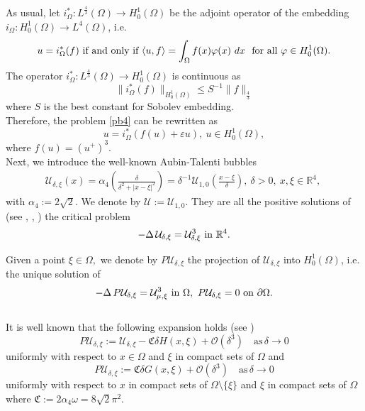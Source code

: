 \documentclass[11pt,a4paper]{amsart}
\renewcommand{\d }{\delta }
\newcommand{\Ua}{{\mathcal{U}}}
\newcommand{\U}{{\mathcal{U}_{\delta, \xi}}}
\theoremstyle{definition}
\renewcommand{\(}{\left(}
\renewcommand{\)}{\right)}
\begin{document}
As usual, let $i^{*}_\Omega: L^{\frac{4}{3}}(\Omega) \to H^{1}_{0}(\Omega)$ be the adjoint operator of the embedding $i_\Omega : H^{1}_{0}(\Omega) \to L^{4}(\Omega)$, i.e. 
$$u=i^{*}_\Omega(f)\ \hbox{if and only if}\ 
\langle u, f \rangle = \int_{\Omega} f(x) \varphi(x) \ dx
\ \hbox{
for all}\ \varphi \in H^{1}_{0}(\Omega).
$$
The operator $i^{*}_\Omega : L^{\frac{4}{3}}(\Omega) \to H^{1}_{0}(\Omega)$ is continuous as 
\begin{equation*}
\| i^{*}_\Omega(f) \|_{H^{1}_{0}(\Omega)} \leq S^{-1} \| f \|_{\frac{4}{3}}
\end{equation*}
where $S$ is the best constant for Sobolev embedding.\\
Therefore, the  problem \eqref{pb4} can be rewritten as 
\begin{equation}\label{213}
u=i^{*}_\Omega(f(u)+ \varepsilon u),\ u \in H^{1}_{0}(\Omega),
\end{equation}
where $f(u)=(u^+)^3.$ \\
Next, we introduce the well-known Aubin-Talenti bubbles  
\begin{eqnarray*}
\mathcal{U}_{\delta,\xi}(x)=\alpha_4\left(\frac{\delta}{\delta^{2}+|x-\xi|^2}\right)=\delta^{-1}\mathcal{U}_{1,0}\left(\frac{x-\xi}{\delta}\right),\ \delta>0,\ x,\xi\in\mathbb R^4,\  
\end{eqnarray*}
with $\alpha_4:=2\sqrt 2$. We denote by $\Ua:=\mathcal{U}_{1,0}$.
They are all the positive solutions of (see \cite{A}, \cite{CGS}, \cite{T}) the critical problem
\begin{equation}\label{pblim}
 -\Delta\, \mathcal{U}_{\delta,\xi}=\mathcal{U}_{\delta,\xi}^{3}\ \hbox{in}\ \mathbb R^4.\end{equation}

Given a point $\xi\in\Omega,$ we denote by $P\mathcal{U}_{\delta,\xi}$ the projection of $\mathcal{U}_{\delta,\xi}$ into $H^1_0(\Omega)$, i.e. the unique solution  of 
\begin{eqnarray}\label{Pre0001}
 -\Delta\, P\mathcal{U}_{\delta,\xi}=\mathcal{U}_{\mu,\xi}^{3}\ \hbox{in}\ \Omega,\ 
 P\mathcal{U}_{\delta,\xi}=0\ \hbox{on}\ \partial\Omega.
\end{eqnarray}
\\  It is well known that the following expansion holds (see \cite{R})
\begin{equation}\label{exp}
P\U:=\U-\mathfrak C\d H(x, \xi)+\mathcal O\left(\d^{3}\right)\quad \mbox{as}\, \d\to 0\end{equation}
uniformly with respect to $x\in\Omega$ and $\xi$ in compact sets of $\Omega$ and 
\begin{equation}\label{exp1}
P\U:=\mathfrak C\d G(x, \xi)+\mathcal O\left(\d^{3}\right)\quad \mbox{as}\, \d\to 0\end{equation}
uniformly with respect to $x$ in compact sets of $\Omega\setminus\{\xi\}$ and $\xi$ in compact sets of $\Omega$ where $\mathfrak C:=2\alpha_4\omega=8\sqrt2\pi^2$.\\  
\end{document}

